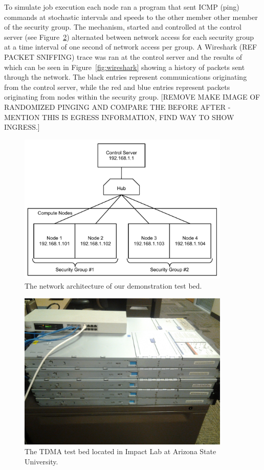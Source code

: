 \documentclass[oneside,12pt]{memoir}
\begin{document}
To simulate job execution each node ran a program that sent ICMP (ping) commands at stochastic intervals and speeds to the other member other member of the security group. The mechanism, started and controlled at the control server (see Figure~\ref{fig:test_bed}) alternated between network access for each security group at a time interval of one second of network access per group. A Wireshark (REF PACKET SNIFFING) trace was ran at the control server and the results of which can be seen in Figure~\ref{fig:wireshark} showing a history of packets sent through the network. The black entries represent communications originating from the control server, while the red and blue entries represent packets originating from nodes within the security group. [REMOVE MAKE IMAGE OF RANDOMIZED PINGING AND COMPARE THE BEFORE AFTER - MENTION THIS IS EGRESS INFORMATION, FIND WAY TO SHOW INGRESS.]
\begin{figure}
  \begin{center}
    \includegraphics[width=0.9\textwidth]{tdm_demo_setup.pdf}
  \end{center}
  \caption{The network architecture of our demonstration test bed.}
\label{fig:tdm_demo_setup}
\end{figure}

\begin{figure}
  \begin{center}
    \includegraphics[width=0.9\textwidth]{test_bed.jpg}
  \end{center}
  \caption{The TDMA test bed located in Impact Lab at Arizona State University.}
\label{fig:test_bed}
\end{figure}
    
\end{document}
